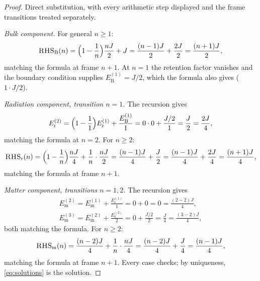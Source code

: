 \documentclass[11pt]{amsbook}
\theoremstyle{plain}
\theoremstyle{definition}
\theoremstyle{remark}
\begin{document}
\begin{proof}
Direct substitution, with every arithmetic step displayed and the frame transitions treated separately.

\emph{Bulk component.} For general $n \geq 1$:
\begin{equation}\label{eq:checkB}
\textsc{RHS}_{\mathrm B}(n) = \Bigl(1 - \frac{1}{n}\Bigr)\frac{nJ}{2} + J = \frac{(n-1)J}{2} + \frac{2J}{2} = \frac{(n+1)J}{2},
\end{equation}
matching the formula at frame $n+1$. At $n = 1$ the retention factor vanishes and the boundary condition supplies $E_{\mathrm B}^{(1)} = J/2$, which the formula also gives ($1 \cdot J/2$).

\emph{Radiation component, transition $n = 1$.} The recursion gives
\begin{equation}\label{eq:checkR1}
E_{\mathrm r}^{(2)} = \Bigl(1 - \frac{1}{1}\Bigr) E_{\mathrm r}^{(1)} + \frac{E_{\mathrm B}^{(1)}}{1} = 0 \cdot 0 + \frac{J/2}{1} = \frac{J}{2} = \frac{2J}{4},
\end{equation}
matching the formula at $n = 2$. For $n \geq 2$:
\begin{equation}\label{eq:checkR2}
\textsc{RHS}_{\mathrm r}(n) = \Bigl(1 - \frac{1}{n}\Bigr)\frac{nJ}{4} + \frac{1}{n}\cdot\frac{nJ}{2} = \frac{(n-1)J}{4} + \frac{J}{2} = \frac{(n-1)J}{4} + \frac{2J}{4} = \frac{(n+1)J}{4},
\end{equation}
matching the formula at frame $n+1$.

\emph{Matter component, transitions $n = 1, 2$.} The recursion gives
\begin{equation}\label{eq:checkM1}
\begin{gathered}
E_{\mathrm m}^{(2)} = E_{\mathrm m}^{(1)} + \frac{E_{\mathrm r}^{(1)}}{1} = 0 + 0 = 0 = \frac{(2-2)J}{4},\\
E_{\mathrm m}^{(3)} = E_{\mathrm m}^{(2)} + \frac{E_{\mathrm r}^{(2)}}{2} = 0 + \frac{J/2}{2} = \frac{J}{4} = \frac{(3-2)J}{4},
\end{gathered}
\end{equation}
both matching the formula. For $n \geq 2$:
\begin{equation}\label{eq:checkM2}
\textsc{RHS}_{\mathrm m}(n) = \frac{(n-2)J}{4} + \frac{1}{n}\cdot\frac{nJ}{4} = \frac{(n-2)J}{4} + \frac{J}{4} = \frac{(n-1)J}{4},
\end{equation}
matching the formula at frame $n+1$. Every case checks; by uniqueness, \cref{eq:solutions} is the solution.
\end{proof}
\end{document}
